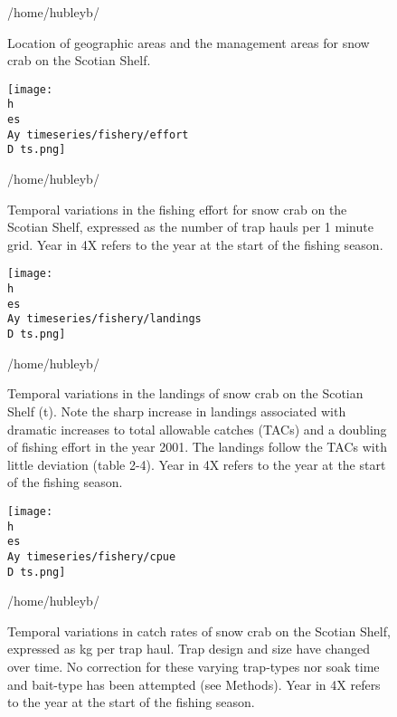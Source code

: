 \documentclass[11pt]{article}
\newcommand{\D}{.}
\newcommand{\h}{/home/hubleyb/}
\newcommand{\es}{bio.data/bio.snowcrab/}
\newcommand{\Ay}{assessments/2016/}
\newcommand{\A}{assessments/}
\begin{document}
\begin{figure}
    
    \caption{Location of geographic areas and the management areas for snow crab on the Scotian Shelf.}
  
\h \end{figure}
\clearpage
\begin{figure}
    
    \texttt{[image: \\h \\es \\Ay timeseries/fishery/effort\\D ts.png]}
    \caption{Temporal variations in the fishing effort for snow crab on the Scotian Shelf, expressed as the number of trap hauls per 1 minute grid. Year in 4X refers to the year at the start of the fishing season.}

\h \end{figure}
\clearpage
\begin{figure}
    
    \texttt{[image: \\h \\es \\Ay timeseries/fishery/landings\\D ts.png]}
    \caption{Temporal variations in the landings of snow crab on the Scotian Shelf (t). Note the sharp increase in landings associated with dramatic increases to total allowable catches (TACs) and a doubling of fishing effort in the year 2001. The landings follow the TACs with little deviation (table 2-4). Year in 4X refers to the year at the start of the fishing season.}

\h \end{figure}
\clearpage
\begin{figure}
    
    \texttt{[image: \\h \\es \\Ay timeseries/fishery/cpue\\D ts.png]}
    \caption{Temporal variations in catch rates of snow crab on the Scotian Shelf, expressed as kg per trap haul. Trap design and size have changed over time. No correction for these varying trap-types nor soak time and bait-type has been attempted (see Methods). Year in 4X refers to the year at the start of the fishing season.}

\h \end{figure}
\clearpage
\end{document}
